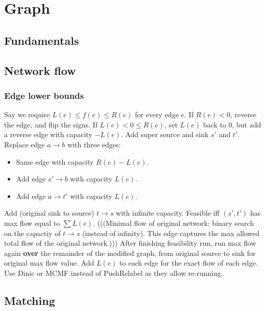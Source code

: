 \chapter{Graph}

\section{Fundamentals}

\section{Network flow}
	\subsection{Edge lower bounds}
		Say we require $L(e) \leq f(e) \leq R(e)$ for every edge $e$. If $R(e) < 0$, reverse the edge, and flip the signs. If $L(e) < 0 \le R(e)$, set $L(e)$ back to $0$, but add a reverse edge with capacity $-L(e)$. Add super source and sink $s'$ and $t'$. Replace edge $a \to b$ with three edges:
			\begin{itemize}
				\item Same edge with capacity $R(e) - L(e)$.
				\item Add edge $s' \to b$ with capacity $L(e)$.
				\item Add edge $a \to t'$ with capacity $L(e)$.
			\end{itemize}
		Add (original sink to source) $t\to s$ with infinite capacity. Feasible iff $(s', t')$ has max flow equal to $\sum L(e)$. (((Minimal flow of original network: binary search on the capactiy of $t\to s$ (instead of infinity). This edge captures the max allowed total flow of the original network.))) After finishing feasibility run, run max flow again \textbf{over} the remainder of the modified graph, from original source to sink for original max flow value. Add $L(e)$ to each edge for the exact flow of each edge. Use Dinic or MCMF instead of PushRelabel as they allow re-running.

\section{Matching}


